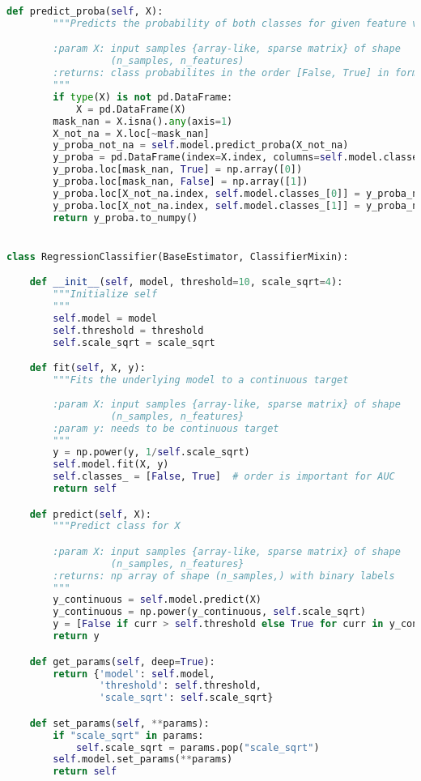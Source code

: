 \begin{lstlisting}[language=Python, basicstyle=\scriptsize, tabsize=4]
    def predict_proba(self, X):
        """Predicts the probability of both classes for given feature vectors

        :param X: input samples {array-like, sparse matrix} of shape
        		  (n_samples, n_features)
        :returns: class probabilites in the order [False, True] in form (n_samples,2)
        """
        if type(X) is not pd.DataFrame:
            X = pd.DataFrame(X)
        mask_nan = X.isna().any(axis=1)
        X_not_na = X.loc[~mask_nan]
        y_proba_not_na = self.model.predict_proba(X_not_na)
        y_proba = pd.DataFrame(index=X.index, columns=self.model.classes_)
        y_proba.loc[mask_nan, True] = np.array([0])
        y_proba.loc[mask_nan, False] = np.array([1])
        y_proba.loc[X_not_na.index, self.model.classes_[0]] = y_proba_not_na[:, 0]
        y_proba.loc[X_not_na.index, self.model.classes_[1]] = y_proba_not_na[:, 1]
        return y_proba.to_numpy()


class RegressionClassifier(BaseEstimator, ClassifierMixin):

    def __init__(self, model, threshold=10, scale_sqrt=4):
        """Initialize self
        """
        self.model = model
        self.threshold = threshold
        self.scale_sqrt = scale_sqrt

    def fit(self, X, y):
        """Fits the underlying model to a continuous target
        
        :param X: input samples {array-like, sparse matrix} of shape
        		  (n_samples, n_features}
        :param y: needs to be continuous target
        """
        y = np.power(y, 1/self.scale_sqrt)
        self.model.fit(X, y)
        self.classes_ = [False, True]  # order is important for AUC
        return self

    def predict(self, X):
        """Predict class for X

        :param X: input samples {array-like, sparse matrix} of shape
        		  (n_samples, n_features}
        :returns: np array of shape (n_samples,) with binary labels
        """
        y_continuous = self.model.predict(X)
        y_continuous = np.power(y_continuous, self.scale_sqrt)
        y = [False if curr > self.threshold else True for curr in y_continuous]
        return y

    def get_params(self, deep=True):
        return {'model': self.model,
                'threshold': self.threshold,
                'scale_sqrt': self.scale_sqrt}

    def set_params(self, **params):
        if "scale_sqrt" in params:
            self.scale_sqrt = params.pop("scale_sqrt")
        self.model.set_params(**params)
        return self


\end{lstlisting}
